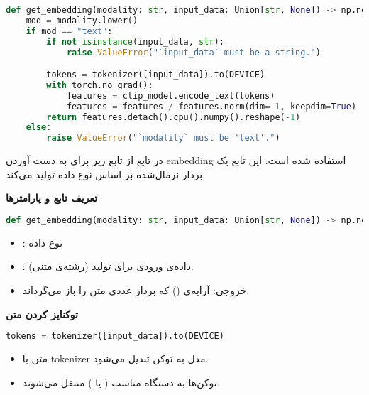 \documentclass{article}
\begin{document}
\begin{latin}
\begin{lstlisting}[language=Python]
def get_embedding(modality: str, input_data: Union[str, None]) -> np.ndarray:
    mod = modality.lower()
    if mod == "text":
        if not isinstance(input_data, str):
            raise ValueError("`input_data` must be a string.")

        tokens = tokenizer([input_data]).to(DEVICE)
        with torch.no_grad():
            features = clip_model.encode_text(tokens)
            features = features / features.norm(dim=-1, keepdim=True)
        return features.detach().cpu().numpy().reshape(-1)
    else:
        raise ValueError("`modality` must be 'text'.")
\end{lstlisting}
\end{latin}

در تابع  از تابع زیر برای به دست آوردن embedding استفاده شده است. این تابع یک بردار  نرمال‌شده بر اساس نوع داده تولید می‌کند.  

\textbf{تعریف تابع و پارامترها}
\begin{latin}
\begin{lstlisting}[language=Python]
def get_embedding(modality: str, input_data: Union[str, None]) -> np.ndarray:
\end{lstlisting}
\end{latin}

\begin{itemize}
    \item {}: نوع داده
    \item {}: داده‌ی ورودی برای تولید  (رشته‌ی متنی).  
    \item خروجی: آرایه‌ی  () که بردار عددی متن را باز می‌گرداند.  
\end{itemize}

\textbf{توکنایز کردن متن}

\begin{latin}
\begin{lstlisting}[language=Python]
tokens = tokenizer([input_data]).to(DEVICE)
\end{lstlisting}
\end{latin}

\begin{itemize}
    \item متن با tokenizer مدل  به توکن تبدیل می‌شود.  
    \item توکن‌ها به دستگاه مناسب ( یا ) منتقل می‌شوند.  
\end{itemize}
\end{document}
